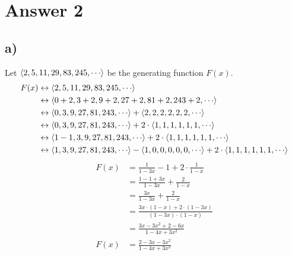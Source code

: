 \documentclass[12pt]{article}
\begin{document}
\section*{Answer 2}
\subsection*{a) }
Let $\Braket{2, 5, 11, 29, 83, 245, \cdots}$ be the generating function $F(x)$.
\begin{align*}
F(x) &\leftrightarrow \Braket{2, 5, 11, 29, 83, 245, \cdots} \\
&\leftrightarrow \Braket{0+2, 3+2, 9+2, 27+2, 81+2, 243+2, \cdots} \\
&\leftrightarrow \Braket{0, 3, 9, 27, 81, 243, \cdots} + \Braket{2, 2, 2, 2, 2, 2, \cdots} \\
&\leftrightarrow \Braket{0, 3, 9, 27, 81, 243, \cdots} + 2 \cdot \Braket{1, 1, 1, 1, 1, 1, \cdots} \\
&\leftrightarrow \Braket{1-1, 3, 9, 27, 81, 243, \cdots} + 2 \cdot \Braket{1, 1, 1, 1, 1, 1, \cdots} \\
&\leftrightarrow \Braket{1, 3, 9, 27, 81, 243, \cdots} - \Braket{1, 0, 0, 0, 0, 0, \cdots} + 2 \cdot \Braket{1, 1, 1, 1, 1, 1, \cdots}
\end{align*}
\begin{align*}
F(x) &= \frac{1}{1-3x} - 1 + 2 \cdot \frac{1}{1-x} \\
&= \frac{1-1+3x}{1-3x} + \frac{2}{1-x} \\
&= \frac{3x}{1-3x} + \frac{2}{1-x} \\
&= \frac{3x \cdot (1-x) + 2 \cdot (1-3x)}{(1-3x) \cdot (1-x)} \\
&= \frac{3x - 3x^2 + 2 - 6x}{1 - 4x + 3x^2} \\
F(x) &= \frac{2 - 3x - 3x^2}{1 - 4x + 3x^2}
\end{align*}
\end{document}
